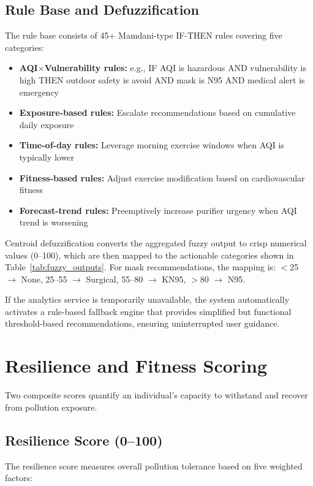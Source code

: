 \documentclass[12pt,a4paper]{report}
\begin{document}
\subsection{Rule Base and Defuzzification}

The rule base consists of 45+ Mamdani-type IF-THEN rules covering five categories:
\begin{itemize}[leftmargin=*]
  \item \textbf{AQI$\times$Vulnerability rules:} e.g., IF AQI is hazardous AND vulnerability is high THEN outdoor safety is avoid AND mask is N95 AND medical alert is emergency
  \item \textbf{Exposure-based rules:} Escalate recommendations based on cumulative daily exposure
  \item \textbf{Time-of-day rules:} Leverage morning exercise windows when AQI is typically lower
  \item \textbf{Fitness-based rules:} Adjust exercise modification based on cardiovascular fitness
  \item \textbf{Forecast-trend rules:} Preemptively increase purifier urgency when AQI trend is worsening
\end{itemize}

Centroid defuzzification converts the aggregated fuzzy output to crisp numerical values (0--100), which are then mapped to the actionable categories shown in Table~\ref{tab:fuzzy_outputs}. For mask recommendations, the mapping is: $<$25 $\rightarrow$ None, 25--55 $\rightarrow$ Surgical, 55--80 $\rightarrow$ KN95, $>$80 $\rightarrow$ N95.

If the analytics service is temporarily unavailable, the system automatically activates a rule-based fallback engine that provides simplified but functional threshold-based recommendations, ensuring uninterrupted user guidance.

\section{Resilience and Fitness Scoring}

Two composite scores quantify an individual's capacity to withstand and recover from pollution exposure.

\subsection{Resilience Score (0--100)}

The resilience score measures overall pollution tolerance based on five weighted factors:
\end{document}
